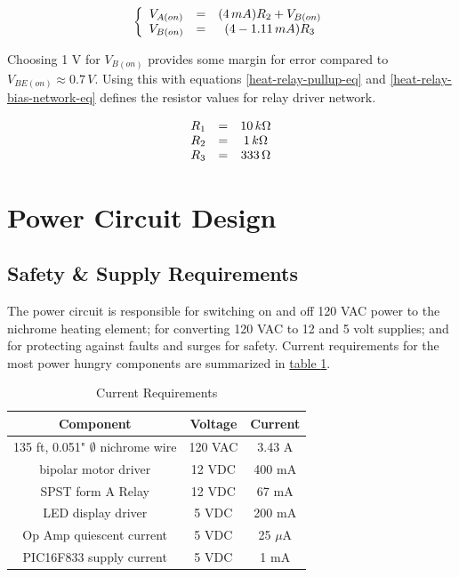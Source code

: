 \documentclass[10pt, twocolumn]{article}
\begin{document}
\begin{equation*}
\left\{\begin{array}{c c c}
V_{A(on)}	&=&	(4\,mA)R_{2}+V_{B(on)}	\\
V_{B(on)}	&=&	(4-1.11\,mA)R_{3}	\\
\end{array}\right.
\end{equation*}

Choosing 1 V for $V_{B(on)}$ provides some margin for error compared to $V_{BE(on)}\approx 0.7\,V$.
Using this with equations
\ref{heat-relay-pullup-eq} and \ref{heat-relay-bias-network-eq}
defines the resistor values for relay driver network.

\begin{equation}
\begin{array}{c c c}
R_{1}	&=&	10\,k\Omega	\\
R_{2}	&=&	1\,k\Omega	\\
R_{3}	&=&	333\,\Omega	\\
\end{array}
\end{equation}

\section{Power Circuit Design}

\subsection{Safety \& Supply Requirements}

The power circuit is responsible for switching on and off 120 VAC power
to the nichrome heating element; for converting 120 VAC to 12 and 5 volt
supplies; and for protecting against faults and surges for safety.
Current requirements for the most power hungry components are summarized in
\hyperref[current-requirements-table]{table \ref{current-requirements-table}}.

\begin{table}
	\centering
	\small
	\caption{Current Requirements}
	\begin{tabular}{c c c}
		\hline\hline
		Component					&Voltage	&Current	\\
		\hline
		135 ft, 0.051" $\emptyset$ nichrome wire	&120 VAC	&3.43 A	\\
		bipolar motor driver		&12 VDC		&400 mA	\\
		SPST form A Relay				&12 VDC		&67 mA	\\
		LED display driver				&5 VDC		&200 mA	\\
		Op Amp quiescent current			&5 VDC		&25 $\mu$A	\\
		PIC16F833 supply current			&5 VDC		&1 mA	\\
		\hline\hline
	\end{tabular}
	\label{current-requirements-table}
\end{table}
\end{document}

